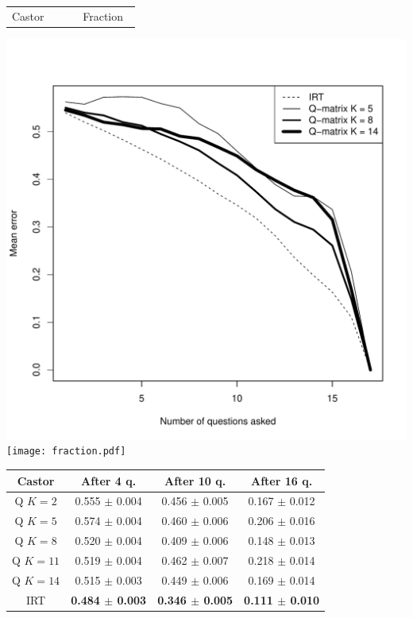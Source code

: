 \documentclass{edm_template}
\begin{document}



\begin{table}[h]
\begin{tabular}{m{0.49\linewidth}m{0.4\linewidth}}
\centering Castor & \centering Fraction
\end{tabular}\vspace{-5mm}
\includegraphics[width=0.49\linewidth]{castor.pdf}
\texttt{[image: fraction.pdf]}
\scriptsize\centering\begin{tabular}{@{}c|ccc@{}}
\textbf{Castor} & After 4 q. & After 10 q. & After 16 q.\\
\hline
\textsf{Q} $K = 2$ & 0.555 $\pm$ 0.004 & 0.456 $\pm$ 0.005 & 0.167 $\pm$ 0.012 \\
\textsf{Q} $K = 5$ & 0.574 $\pm$ 0.004 & 0.460 $\pm$ 0.006 & 0.206 $\pm$ 0.016 \\
\textsf{Q} $K = 8$ & 0.520 $\pm$ 0.004 & 0.409 $\pm$ 0.006 & 0.148 $\pm$ 0.013 \\
\textsf{Q} $K = 11$ & 0.519 $\pm$ 0.004 & 0.462 $\pm$ 0.007 & 0.218 $\pm$ 0.014 \\
\textsf{Q} $K = 14$ & 0.515 $\pm$ 0.003 & 0.449 $\pm$ 0.006 & 0.169 $\pm$ 0.014 \\
\textsf{IRT} & \textbf{0.484 $\pm$ \textbf0.003} & \textbf{0.346 $\pm$ 0.005} & \textbf{0.111 $\pm$ 0.010} \\
\end{tabular}


\end{table}
\end{document}
